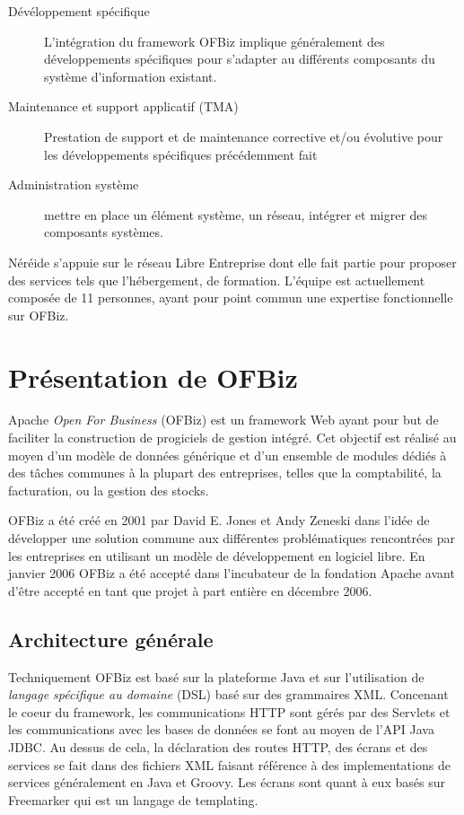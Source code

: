 \documentclass[a4paper, 11pt]{report}
\begin{document}
\begin{description}
\item[Dévéloppement spécifique] L'intégration du framework OFBiz
  implique généralement des développements spécifiques pour s'adapter au
  différents composants du système d'information existant.
\item[Maintenance et support applicatif (TMA)] Prestation de support
  et de maintenance corrective et/ou évolutive pour les développements
  spécifiques précédemment fait
\item[Administration système] mettre en place un élément système, un
  réseau, intégrer et migrer des composants systèmes.
\end{description}

Néréide s'appuie sur le réseau Libre Entreprise dont elle fait partie
pour proposer des services tels que l'hébergement, de formation.
L'équipe est actuellement composée de 11 personnes, ayant pour point
commun une expertise fonctionnelle sur OFBiz.

\chapter{Présentation de OFBiz}

Apache \emph{Open For Business} (OFBiz) est un framework Web ayant
pour but de faciliter la construction de progiciels de gestion
intégré.  Cet objectif est réalisé au moyen d'un modèle de données
générique et d'un ensemble de modules dédiés à des tâches communes à la
plupart des entreprises, telles que la comptabilité, la facturation,
ou la gestion des stocks.

OFBiz a été créé en 2001 par David E. Jones et Andy Zeneski dans
l'idée de développer une solution commune aux différentes
problématiques rencontrées par les entreprises en utilisant un modèle
de développement en logiciel libre. En janvier 2006 OFBiz a été accepté
dans l'incubateur de la fondation Apache avant d'être accepté en tant
que projet à part entière en décembre 2006.

\section{Architecture générale}

Techniquement OFBiz est basé sur la plateforme Java et sur
l'utilisation de \emph{langage spécifique au domaine} (DSL) basé sur
des grammaires XML.  Concenant le coeur du framework, les
communications HTTP sont gérés par des Servlets \cite{chan2017servlet}
et les communications avec les bases de données se font au moyen de
l'API Java JDBC.  Au dessus de cela, la déclaration des routes HTTP,
des écrans et des services se fait dans des fichiers XML faisant
référence à des implementations de services généralement en Java et
Groovy. Les écrans sont quant à eux basés sur Freemarker qui est un
langage de templating.
\end{document}
